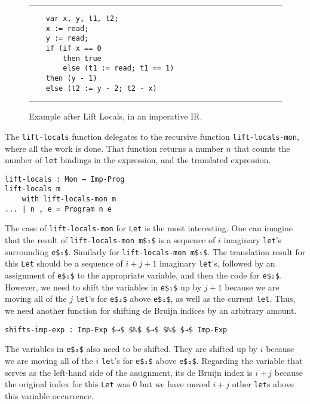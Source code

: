 \documentclass[sigplan,review,dvipsnames,screen,10pt]{acmart}
\begin{document}
\begin{figure}[tp]
  \hrule
\begin{lstlisting}
    var x, y, t1, t2;
    x := read;
    y := read;
    if (if x == 0
        then true
        else (t1 := read; t1 == 1)
    then (y - 1)
    else (t2 := y - 2; t2 - x)
\end{lstlisting}
  \hrule
  \caption{Example after Lift Locals, in an imperative IR.}
  \label{fig:running-example-structured-imperative}
\end{figure}
The \lstinline{lift-locals} function delegates to the recursive
function \lstinline{lift-locals-mon}, where all the work is done.
That function returns a number $n$ that counts the number of
\lstinline{let} bindings in the expression, and the translated
expression.

\begin{lstlisting}
lift-locals : Mon → Imp-Prog
lift-locals m
    with lift-locals-mon m
... | n , e = Program n e    
\end{lstlisting}

\noindent The case of \lstinline{lift-locals-mon} for \lstinline{Let}
is the most interesting. One can imagine that the result of
\lstinline{lift-locals-mon m$₁$} is a sequence of $i$ imaginary
\lstinline{let}'s surrounding \lstinline{e$₁$}. Similarly for 
\lstinline{lift-locals-mon m$₁$}.
The translation result for this \lstinline{Let} should be
a sequence of $i + j + 1$ imaginary
\lstinline{let}'s, followed by an assignment
of \lstinline{e$₁$} to the appropriate variable, and then the
code for \lstinline{e$₂$}. However, we need to shift
the variables in \lstinline{e$₁$} up by $j + 1$ because
we are moving all of the $j$ \lstinline{let}'s for
\lstinline{e$₂$} above \lstinline{e$₁$}, as well as the
current \lstinline{let}. Thus, we need another function
for shifting de Bruijn indices by an arbitrary amount.

\begin{lstlisting}
shifts-imp-exp : Imp-Exp $→$ $ℕ$ $→$ $ℕ$ $→$ Imp-Exp
\end{lstlisting}

The variables in \lstinline{e$₂$} also need to be shifted.  They are
shifted up by $i$ because we are moving all of the $i$
\lstinline{let}'s for \lstinline{e$₁$} above
\lstinline{e$₂$}. Regarding the variable that serves as the left-hand
side of the assignment, its de Bruijn index is $i + j$ because the
original index for this \lstinline{Let} was $0$ but we have moved $i +
j$ other \lstinline{let}s above this variable occurrence.
\end{document}

